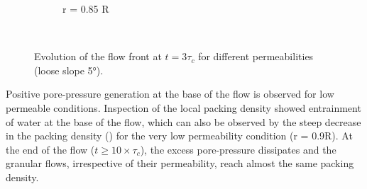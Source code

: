 \begin{figure}
{\begin{subfigure}[b]{0.95\textwidth}
    \caption{r = 0.85 R}
    \label{fig:LBM_660_Slope5_r085}
\end{subfigure}
}\\
\caption{Evolution of the flow front at $t = 3\tau_c$ for different 
permeabilities (loose slope 5\si{\degree}).}
\label{fig:slope_loose_5}
\end{figure}

Positive pore-pressure generation at the base of the flow is observed for low 
permeable conditions. Inspection of the local packing density showed 
entrainment of water at the base of the flow, which can also be observed by the 
steep decrease in the packing density () for the very low 
permeability condition (r = 0.9R). At the end of the flow ($t \ge 10 \times 
\tau_c$), the excess pore-pressure dissipates and the granular flows, 
irrespective of their permeability, reach almost the same packing density.


